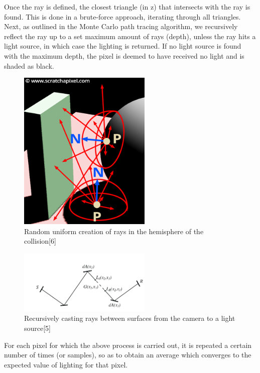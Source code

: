 \documentclass[journal]{IEEEtran}
\begin{document}
\par
Once the ray is defined, the closest triangle (in z) that intersects with the ray is found. This is done in a brute-force approach, iterating through all triangles.
Next, as outlined in the Monte Carlo path tracing algorithm, we recursively reflect the ray up to a set maximum amount of rays (depth), unless the ray hits a light source, in which case the lighting is returned. If no light source is found with the maximum depth, the pixel is deemed to have received no light and is shaded as black.

\begin{figure}[!t]

\centering
\includegraphics[width=2.5in]{shad2-indirectdiffusehemi.png}
\caption{Random uniform creation of rays in the hemisphere of the collision[6]}
\label{hemisphere rays}

\end{figure}

\begin{figure}[!t]

\centering
\includegraphics[width=2.5in]{recursive_rays}
\caption{Recursively casting rays between surfaces from the camera to a light source[5]}
\label{recursive_rays}

\end{figure}

\par
For each pixel for which the above process is carried out, it is repeated a certain number of times (or samples), so as to obtain an average which converges to the expected value of lighting for that pixel.
\end{document}
